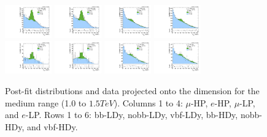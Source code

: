\begin{figure}[htbp]
  \includegraphics[width=0.18\textwidth]{fig/fitValidation/PostFit_SR_MJJ_MVV1000to1500__mu_HP_nobb_HDy_Run2.pdf}
  \includegraphics[width=0.18\textwidth]{fig/fitValidation/PostFit_SR_MJJ_MVV1000to1500__e_HP_nobb_HDy_Run2.pdf}
  \includegraphics[width=0.18\textwidth]{fig/fitValidation/PostFit_SR_MJJ_MVV1000to1500__mu_LP_nobb_HDy_Run2.pdf}
  \includegraphics[width=0.18\textwidth]{fig/fitValidation/PostFit_SR_MJJ_MVV1000to1500__e_LP_nobb_HDy_Run2.pdf}\\
  \includegraphics[width=0.18\textwidth]{fig/fitValidation/PostFit_SR_MJJ_MVV1000to1500__mu_HP_vbf_HDy_Run2.pdf}
  \includegraphics[width=0.18\textwidth]{fig/fitValidation/PostFit_SR_MJJ_MVV1000to1500__e_HP_vbf_HDy_Run2.pdf}
  \includegraphics[width=0.18\textwidth]{fig/fitValidation/PostFit_SR_MJJ_MVV1000to1500__mu_LP_vbf_HDy_Run2.pdf}
  \includegraphics[width=0.18\textwidth]{fig/fitValidation/PostFit_SR_MJJ_MVV1000to1500__e_LP_vbf_HDy_Run2.pdf}\\
  \caption{
    Post-fit distributions and data projected onto the \MJ dimension for the medium \MVV range (1.0 to $1.5\unit{TeV}$).
    Columns 1 to 4: $\mu$-HP, $e$-HP, $\mu$-LP, and $e$-LP.
    Rows 1 to 6: bb-LDy, nobb-LDy, vbf-LDy, bb-HDy, nobb-HDy, and vbf-HDy.
  }
  \label{fig:postfit_MJJ_MVV1000to1500_Run2}
\end{figure}

